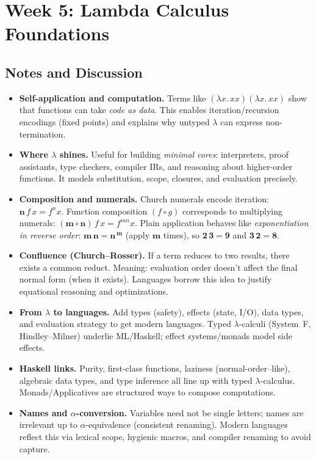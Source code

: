 \documentclass{article}
\theoremstyle{theorem}
\theoremstyle{definition}
\theoremstyle{remark}
\begin{document}
\section{Week 5: Lambda Calculus Foundations}

\subsection{Notes and Discussion}
\begin{itemize}
  \item \textbf{Self-application and computation.} Terms like $(\lambda x.\,xx)(\lambda x.\,xx)$ show that functions can take \emph{code as data}. This enables iteration/recursion encodings (fixed points) and explains why untyped $\lambda$ can express non-termination.
  \item \textbf{Where $\lambda$ shines.} Useful for building \emph{minimal cores}: interpreters, proof assistants, type checkers, compiler IRs, and reasoning about higher-order functions. It models substitution, scope, closures, and evaluation precisely.
  \item \textbf{Composition and numerals.} Church numerals encode iteration: $\mathbf{n}\,f\,x = f^{n}x$. Function composition $(f \circ g)$ corresponds to multiplying numerals: $(\mathbf{m}\circ\mathbf{n})\,f\,x = f^{mn}x$. Plain application behaves like \emph{exponentiation in reverse order}: $\mathbf{m}\,\mathbf{n} = \mathbf{n}^{\,\mathbf{m}}$ (apply $\mathbf{m}$ times), so $\mathbf{2}\,\mathbf{3}=\mathbf{9}$ and $\mathbf{3}\,\mathbf{2}=\mathbf{8}$.
  \item \textbf{Confluence (Church–Rosser).} If a term reduces to two results, there exists a common reduct. Meaning: evaluation order doesn’t affect the final normal form (when it exists). Languages borrow this idea to justify equational reasoning and optimizations.
  \item \textbf{From $\lambda$ to languages.} Add types (safety), effects (state, I/O), data types, and evaluation strategy to get modern languages. Typed $\lambda$-calculi (System~F, Hindley–Milner) underlie ML/Haskell; effect systems/monads model side effects.
  \item \textbf{Haskell links.} Purity, first-class functions, laziness (normal-order–like), algebraic data types, and type inference all line up with typed $\lambda$-calculus. Monads/Applicatives are structured ways to compose computations.
  \item \textbf{Names and $\alpha$-conversion.} Variables need not be single letters; names are irrelevant up to $\alpha$-equivalence (consistent renaming). Modern languages reflect this via lexical scope, hygienic macros, and compiler renaming to avoid capture.

\end{itemize}
\end{document}
